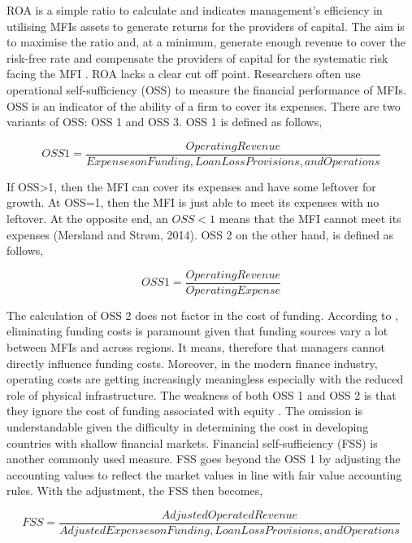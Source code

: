 \documentclass[a4paper,nobind]{templates/ociamthesis}
\begin{document}
ROA is a simple ratio to calculate and indicates management's efficiency in utilising MFIs assets to generate returns for the providers of capital. The aim is to maximise the ratio and, at a minimum, generate enough revenue to cover the risk-free rate and compensate the providers of capital for the systematic risk facing the MFI \autocite{mersland2014microfinance}. ROA lacks a clear cut off point. Researchers often use operational self-sufficiency (OSS) to measure the financial performance of MFIs. OSS is an indicator of the ability of a firm to cover its expenses. There are two variants of OSS: OSS 1 and OSS 3. OSS 1 is defined as follows,

\begin{equation}
OSS1 = \frac{Operating Revenue}{Expenses on Funding, Loan Loss Provisions, and Operations}
\end{equation}

If OSS\textgreater1, then the MFI can cover its expenses and have some leftover for growth. At OSS=1, then the MFI is just able to meet its expenses with no leftover. At the opposite end, an \(OSS < 1\) means that the MFI cannot meet its expenses (Mersland and Strøm, 2014).
OSS 2 on the other hand, is defined as follows,

\begin{equation}
OSS1 = \frac{Operating Revenue}{Operating Expense}
\end{equation}

The calculation of OSS 2 does not factor in the cost of funding. According to \textcite{mersland2014microfinance}, eliminating funding costs is paramount given that funding sources vary a lot between MFIs and across regions. It means, therefore that managers cannot directly influence funding costs. Moreover, in the modern finance industry, operating costs are getting increasingly meaningless especially with the reduced role of physical infrastructure. The weakness of both OSS 1 and OSS 2 is that they ignore the cost of funding associated with equity \autocite{mersland2014microfinance}. The omission is understandable given the difficulty in determining the cost in developing countries with shallow financial markets. Financial self-sufficiency (FSS) is another commonly used measure. FSS goes beyond the OSS 1 by adjusting the accounting values to reflect the market values in line with fair value accounting rules. With the adjustment, the FSS then becomes,

\begin{equation}
FSS = \frac{Adjusted Operated Revenue}{Adjusted Expenses on Funding, Loan Loss Provisions, and Operations}
\end{equation}
\end{document}
